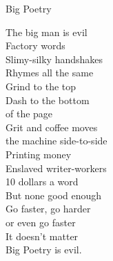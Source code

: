 Big Poetry

The big man is evil\\
Factory words\\
Slimy-silky handshakes\\
Rhymes all the same\\
Grind to the top\\
Dash to the bottom\\
of the page\\
Grit and coffee moves\\
the machine side-to-side\\
Printing money\\
Enslaved writer-workers\\
10 dollars a word\\
But none good enough\\
Go faster, go harder\\
or even go faster\\
It doesn't matter\\
Big Poetry is evil.\\

